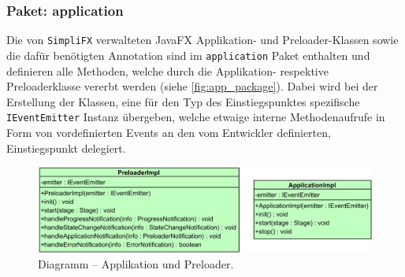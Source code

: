 \subsubsection{Paket: application}
Die von \texttt{SimpliFX} verwalteten JavaFX Applikation- und Preloader-Klassen sowie die dafür benötigten Annotation sind im \texttt{application} Paket enthalten und definieren alle Methoden, welche durch die Applikation- respektive Preloaderklasse vererbt werden (siehe \autoref{fig:app_package}). Dabei wird bei der Erstellung der Klassen, eine für den Typ des Einstiegspunktes spezifische \texttt{IEventEmitter} Instanz übergeben, welche etwaige interne Methodenaufrufe in Form von vordefinierten Events an den vom Entwickler definierten, Einstiegspunkt delegiert.
\begin{figure}[H]
	\centering
	\includegraphics[width=\textwidth-2cm]{Abbildungen/Applikation und Preloader.png}
	\caption{Diagramm -- Applikation und Preloader.}
	\label{fig:app_package}
\end{figure}
